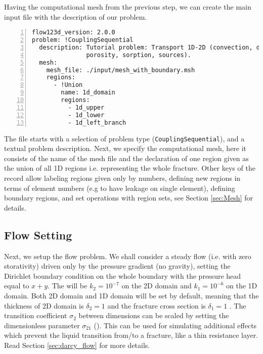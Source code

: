 Having the computational mesh from the previous step, we can create the main input file with the description of our problem. 
\begin{Verbatim}[numbers=left]
flow123d_version: 2.0.0
problem: !CouplingSequential
  description: Tutorial problem: Transport 1D-2D (convection, dual
               porosity, sorption, sources).
  mesh:
    mesh_file: ./input/mesh_with_boundary.msh
    regions:
      - !Union
        name: 1d_domain
        regions:
          - 1d_upper
          - 1d_lower
          - 1d_left_branch
\end{Verbatim}
The file starts with a selection of problem type (\verb'CouplingSequential'), and a textual problem description.
Next, we specify the computational mesh, here it consists of the name of the mesh file and the declaration of one region 
given as the union of all 1D regions i.e. representing the whole fracture. Other keys of the  record allow labeling regions given only by numbers, 
defining new regions in terms of element numbers (e.g to have leakage on single element), 
defining boundary regions, and set operations with region sets, see Section \ref{sec:Mesh} for details.

\subsection{Flow Setting}
Next, we setup the flow problem. We shall consider a steady flow (i.e. with zero storativity) driven only by the pressure gradient (no gravity),
setting the Dirichlet boundary condition on the whole boundary with the pressure head equal to $x+y$. 
The  will be $k_2=10^{-7}$  on the 2D domain and $k_1=10^{-6}$  on the 1D domain.
Both 2D domain and 1D domain  will be set by default,
meaning that the thickness of 2D domain is $\delta_2=1$  and the fracture cross section is $\delta_1=1$ .
The transition coefficient $\sigma_2$ between dimensions can be scaled by setting the dimensionless parameter 
$\sigma_{21}$ (). This can be used for simulating additional
effects which prevent the liquid transition from/to a fracture, like a thin resistance layer. Read Section 
\ref{sec:darcy_flow} for more details.

